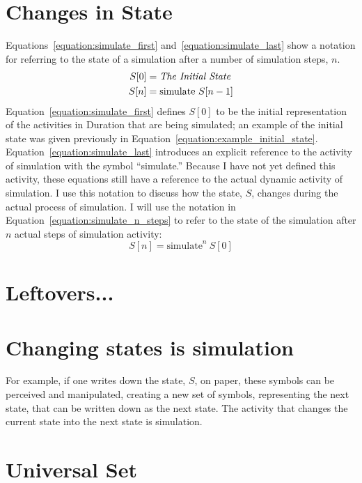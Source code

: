 \section{Changes in State}

Equations~\ref{equation:simulate_first}
and~\ref{equation:simulate_last} show a notation for referring to the
state of a simulation after a number of simulation steps, $n$.
\begin{align}
\label{equation:simulate_first}
S[0] &= \text{\emph{The Initial State}} \\
\label{equation:simulate_last}
S[n] &= \text{simulate}~S[n-1]
\end{align}
Equation~\ref{equation:simulate_first} defines $S[0]$ to be the
initial representation of the activities in Duration that are being
simulated; an example of the initial state was given previously in
Equation~\ref{equation:example_initial_state}.
Equation~\ref{equation:simulate_last} introduces an explicit reference
to the activity of simulation with the symbol ``simulate.''  Because I
have not yet defined this activity, these equations still have a
reference to the actual dynamic activity of simulation.  I use this
notation to discuss how the state, $S$, changes during the actual
process of simulation.  I will use the notation in
Equation~\ref{equation:simulate_n_steps} to refer to the state of the
simulation after $n$ actual steps of simulation activity:
\begin{equation}
\label{equation:simulate_n_steps}
S[n] = \text{simulate}^n~S[0]
\end{equation}

\section{Leftovers...}

\section{Changing states is simulation}

For example, if one writes down the state, $S$, on paper, these
symbols can be perceived and manipulated, creating a new set of
symbols, representing the next state, that can be written down as the
next state.  The activity that changes the current state into the next
state is simulation.

\section{Universal Set}

